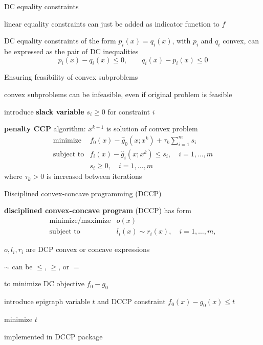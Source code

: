 \documentclass[aspectratio=169,11pt]{beamer}
\begin{document}
\begin{frame}{DC equality constraints}
\BIT
\item linear equality constraints can just be added as indicator 
function to $f$
\item DC equality constraints of the form $p_i(x) = q_i(x)$,
with $p_i$ and $q_i$ convex,
can be expressed as the pair of DC inequalities
\[
p_i(x) - q_i(x) \leq 0, \qquad q_i(x) - p_i(x) \leq 0
\]
\EIT
\end{frame}

\begin{frame}{Ensuring feasibility of convex subproblems}
\BIT
\item convex subproblems can be infeasible,
even if original problem is feasible
\item introduce \textbf{slack variable} $s_i \geq 0$ for constraint $i$
\item \textbf{penalty CCP} algorithm:
$x^{k+1}$ is solution of convex problem
\[
\begin{array}{ll}
\mbox{minimize} & f_0(x) - \hat g_0(x;x^k) + \tau_k \sum_{i=1}^m s_i\\
\mbox{subject to} & f_i(x) - \hat g_i(x;x^k) \leq s_i, \quad i = 1, \ldots, m\\
& s_i \geq 0, \quad i = 1, \ldots, m
\end{array}
\]
where $\tau_k > 0$ is increased between iterations
\EIT
\end{frame}

\begin{frame}{Disciplined convex-concave programming (DCCP)}
\BIT
\item \textbf{disciplined convex-concave program} (DCCP) has form
\[
\begin{array}{ll}
\mbox{minimize/maximize} & o(x) \\
\mbox{subject to} &l_i(x) \sim r_i(x), \quad i = 1, \ldots, m,
\end{array}
\]
\item $o,l_i,r_i$ are DCP convex or concave expressions
\item $\sim$ can be $\leq$, $\geq$, or $=$
\item to minimize DC objective $f_0-g_0$
\BIT
\item introduce epigraph variable $t$ and DCCP constraint $f_0(x)-g_0(x) \leq t$
\item minimize $t$
\EIT
\item implemented in DCCP package
\EIT
\end{frame}
\end{document}
